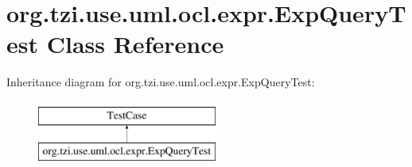\hypertarget{classorg_1_1tzi_1_1use_1_1uml_1_1ocl_1_1expr_1_1_exp_query_test}{\section{org.\-tzi.\-use.\-uml.\-ocl.\-expr.\-Exp\-Query\-Test Class Reference}
\label{classorg_1_1tzi_1_1use_1_1uml_1_1ocl_1_1expr_1_1_exp_query_test}
}
Inheritance diagram for org.\-tzi.\-use.\-uml.\-ocl.\-expr.\-Exp\-Query\-Test\-:\begin{figure}[H]
\begin{center}
\leavevmode
\includegraphics[height=2.000000cm]{classorg_1_1tzi_1_1use_1_1uml_1_1ocl_1_1expr_1_1_exp_query_test}
\end{center}
\end{figure}
